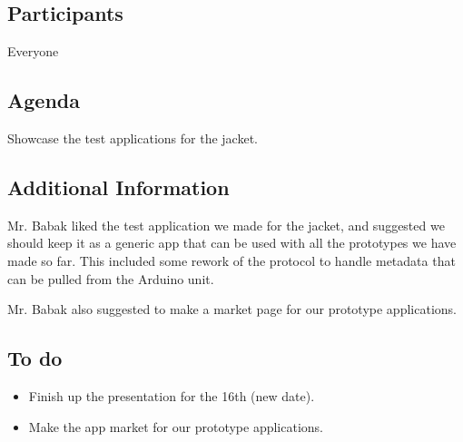 \subsection{Participants}

Everyone

\subsection{Agenda}
Showcase the test applications for the jacket.

\subsection{Additional Information}

Mr. Babak liked the test application we made for the jacket, and suggested we should keep it as a generic app that can be used with all the prototypes we have made so far. This included some rework of the protocol to handle metadata that can be pulled from the Arduino unit.

Mr. Babak also suggested to make a market page for our prototype applications.


\subsection{To do}
\begin{itemize}
\item Finish up the presentation for the 16th (new date).
\item Make the app market for our prototype applications.
\end{itemize}